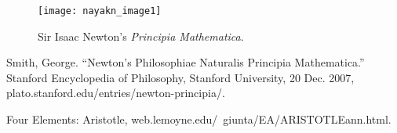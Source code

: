 \renewcommand{\thefigure}{1}
\begin{figure}[h!]
    \centering
    \texttt{[image: nayakn\_image1]}
    \caption{Sir Isaac Newton's \textit{Principia Mathematica}.}
    \label{fig:1}
\end{figure}

\begin{thebibliography}{2}

\bibitem{} 
Smith, George. “Newton's Philosophiae Naturalis Principia Mathematica.” Stanford Encyclopedia of Philosophy, Stanford University, 20 Dec. 2007, plato.stanford.edu/entries/newton-principia/. 

\bibitem{}
Four Elements: Aristotle, web.lemoyne.edu/~giunta/EA/ARISTOTLEann.html. 

\end{thebibliography}
